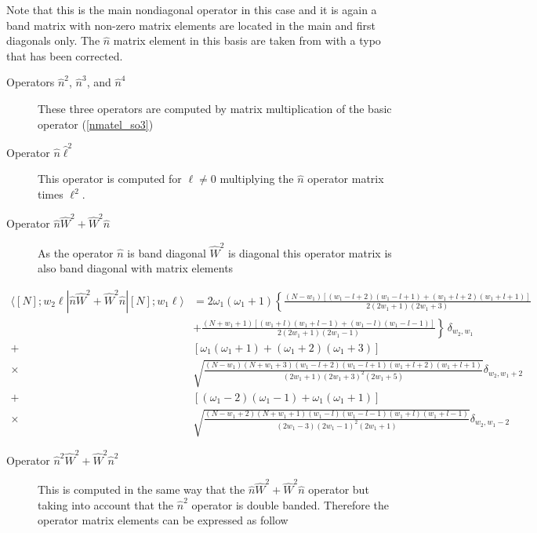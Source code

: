 \documentclass[a4paper,12pt,captions=tableheading]{article}
\begin{document}
Note that this is the main nondiagonal operator in this case and it is again
a band matrix with non-zero matrix elements are located in the main and first diagonals only. The \(\hat n\) matrix element in this basis are taken from
\cite{PBernal2008} with a typo that has been corrected.
\begin{description}
\item[{Operators \(\hat n^2\), \(\hat n^3\), and \(\hat n^4\)}] These three operators are computed by matrix multiplication of the basic operator (\ref{nmatel_so3})

\item[{Operator \(\hat n \hat \ell^{2}\)}] This operator is computed for \(\ell\ne 0\) multiplying the \({\hat n}\) operator matrix times \(\ell^2\).

\item[{Operator \(\hat n \hat W^2 + \hat W^2 \hat n\)}] As the operator
\(\hat n\) is band diagonal \(\hat W^2\) is diagonal this operator matrix is also band diagonal with matrix
elements
\end{description}

\begin{align}
\langle [N];w_2 \ell|\hat n \hat W^2 + \hat W^2 \hat n|[N];w_1 \ell\rangle &=
 2\omega_1(\omega_1+1)  \left\{\frac{(N-w_1)\left[(w_1-l+2)(w_1-l+1) +
        (w_1+l+2)(w_1+l+1)\right]}{2(2w_1+1)(2w_1+3)} \right. \nonumber\\
  & + \left.\frac{(N+w_1+1)\left[(w_1+l)(w_1+l-1) +
        (w_1-l)(w_1-l-1)\right]}{2(2w_1+1)(2w_1-1)} \right\}\,
  \delta_{w_2,w_1} \label{nW2matel_so3}\\
+& \left[\omega_1(\omega_1+1) + (\omega_1 +2)(\omega_1+3)\right]\nonumber\\
\times &  \sqrt{\frac{(N-w_1)(N+w_1+3)(w_1-l+2)(w_1-l+1)(w_1+l+2)(w_1+l+1)}{(2w_1+1)(2w_1+3)^2(2w_1+5)}}\delta_{w_2,w_1+2}\nonumber\\
+& \left[(\omega_1 - 2)(\omega_1-1) + \omega_1 (\omega_1+1)\right]\nonumber\\
\times & \sqrt{\frac{(N-w_1+2)(N+w_1+1)(w_1-l)(w_1-l-1)(w_1+l)(w_1+l-1)}{(2w_1-3)(2w_1-1)^2(2w_1+1)}}\delta_{w_2,w_1-2}\nonumber
\end{align}


\begin{description}
\item[{Operator \(\hat n^2 \hat W^2 + \hat W^2 \hat n^2\)}] This is
computed in the same way that the \(\hat n \hat W^2 + \hat W^2
     \hat n\) operator but taking into account that the \(\hat n^2\)
operator is double banded. Therefore the operator matrix elements
can be expressed as follow
\end{description}
\end{document}
